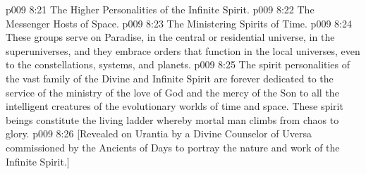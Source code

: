 \vs p009 8:21 \bibnobreakspace The Higher Personalities of the Infinite Spirit.
\vs p009 8:22 \bibnobreakspace The Messenger Hosts of Space.
\vs p009 8:23 \bibnobreakspace The Ministering Spirits of Time.
\vs p009 8:24 These groups serve on Paradise, in the central or residential universe, in the superuniverses, and they embrace orders that function in the local universes, even to the constellations, systems, and planets.
\vs p009 8:25 The spirit personalities of the vast family of the Divine and Infinite Spirit are forever dedicated to the service of the ministry of the love of God and the mercy of the Son to all the intelligent creatures of the evolutionary worlds of time and space. These spirit beings constitute the living ladder whereby mortal man climbs from chaos to glory.
\vsetoff
\vs p009 8:26 [Revealed on Urantia by a Divine Counselor of Uversa commissioned by the Ancients of Days to portray the nature and work of the Infinite Spirit.]
